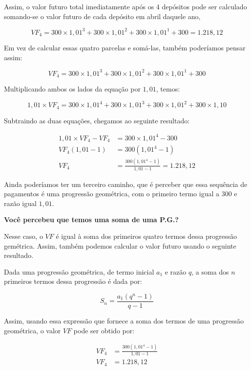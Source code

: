 Assim, o valor futuro total imediatamente após os 4 depósitos pode ser calculado somando-se o valor futuro de cada depósito em abril daquele ano,

$$\mathit{VF}_4=300\times1{,}01^3+300\times1{,}01^2+300\times1{,}01^1+300=1.218{,}12$$

Em vez de calcular essas quatro parcelas e somá-las, também poderíamos pensar assim:

\begin{equation*}
\mathit{VF}_4=300\times1{,}01^3+300\times1{,}01^2+300\times1{,}01^1+300
\end{equation*}

Multiplicando ambos os lados da equação por $1{,}01$, temos:

\begin{equation*}
1{,}01\times \mathit{VF}_4=300\times1{,}01^4+300\times1{,}01^3+300\times 1,01^2+300\times1{,}10
\end{equation*}

Subtraindo as duas equações, chegamos ao seguinte resultado:

\begin{align*}
1{,}01\times \mathit{VF}_4-\mathit{VF}_4&=300\times1{,}01^4-300\\
\mathit{VF}_4(1{,}01-1)&=300(1{,}01^4-1)\\
\mathit{VF}_4&=\frac{300(1{,}01^4-1)}{1{,}01-1}=1.218{,}12
\end{align*}

Ainda poderíamos ter um terceiro caminho, que é perceber que essa sequência de pagamentos é uma progressão geométrica, com o primeiro termo igual a $300$ e razão igual $1{,}01$.

\textbf{Você percebeu que temos uma soma de uma P.G.?}

Nesse caso, o $\mathit{VF}$ é igual à soma dos primeiros quatro termos dessa progressão gemétrica. Assim, também podemos calcular o valor futuro usando o seguinte resultado.

Dada uma progressão geométrica, de termo inicial $a_1$ e razão $q$, a soma dos $n$ primeiros termos dessa progressão é dada por:

\begin{equation*}
S_n=\frac{a_1(q^n-1)}{q-1}
\end{equation*}
 
Assim, usando essa expressão que fornece a soma dos termos de uma progressão geométrica, o valor $\mathit{VF}$ pode ser obtido por:

\begin{align*}
\mathit{VF}_4&=\frac{300(1{,}01^4-1)}{1{,}01-1}\\
\mathit{VF}_4&=1.218{,}12
\end{align*}

